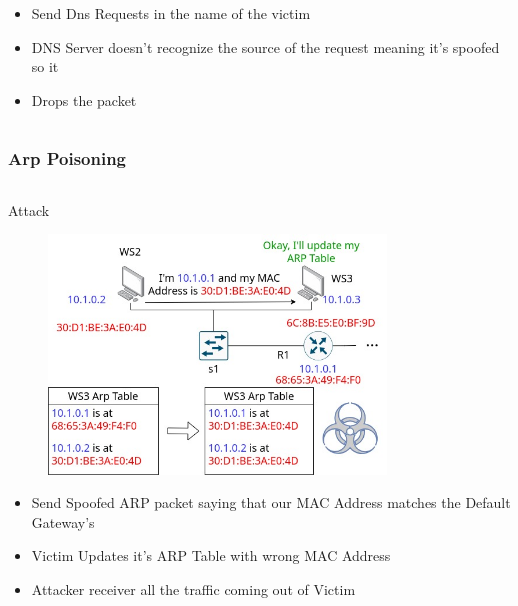 \documentclass{beamer}
\begin{document}
\begin{frame}
\begin{columns}
\begin{column}{0.5\textwidth}
\begin{figure}
        \end{figure}
            \begin{itemize}[label={}]
                \item \footnotesize Send Dns Requests in the name of the victim
                \item \footnotesize DNS Server doesn't recognize the source of the request meaning it's spoofed so it
                \item \footnotesize Drops the packet
            \end{itemize}
    \end{column}
\end{columns}
\end{frame}

\begin{frame}
\frametitle{Arp Poisoning}
\begin{columns}
    \begin{column}{0.5\textwidth}
        \Large Attack
        \begin{figure}
            \centering
            \includegraphics[width=0.8\textwidth]{arp_attack.jpg}\\
        \end{figure}
            \begin{itemize}[label={}]
                \item \footnotesize Send Spoofed ARP packet saying that our MAC Address matches the Default Gateway's
                \item \footnotesize Victim Updates it's ARP Table with wrong MAC Address
               \item \footnotesize Attacker receiver all the traffic coming out of Victim
            \end{itemize}
    \end{column}

\end{columns}
\end{frame}
\end{document}
